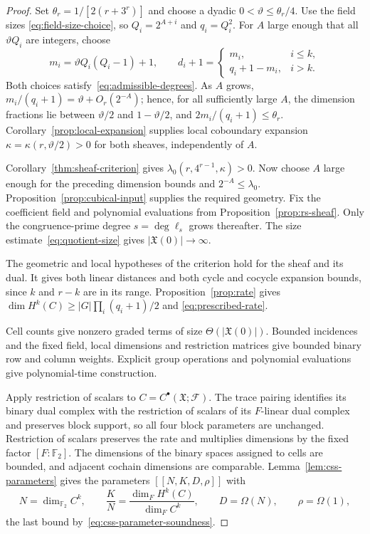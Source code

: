 \documentclass[11pt,letterpaper]{article}
\renewcommand{\le}{\leqslant}
\renewcommand{\ge}{\geqslant}
\theoremstyle{definition}
\theoremstyle{remark}
\newcommand{\F}{\mathbb F}
\newcommand{\cF}{\mathcal F}
\newcommand{\X}{\mathfrak{X}}
\begin{document}
\begin{proof}
Set $\theta_r=1/[2(r+3^r)]$ and choose a dyadic
$0<\vartheta\le\theta_r/4$. Use the field sizes
\eqref{eq:field-size-choice}, so $Q_i=2^{A+i}$ and $q_i=Q_i^2$.
For $A$ large enough that all $\vartheta Q_i$ are integers, choose
\begin{equation}
 m_i=\vartheta Q_i(Q_i-1)+1,\qquad
 d_i+1=\begin{cases}
 m_i,&i\le k,\\
 q_i+1-m_i,&i>k.
 \end{cases}
 \label{eq:local-dimensions}
\end{equation}
Both choices satisfy~\eqref{eq:admissible-degrees}. As $A$ grows,
$m_i/(q_i+1)=\vartheta+O_r(2^{-A})$; hence, for all sufficiently
large $A$, the dimension fractions lie between $\vartheta/2$
and $1-\vartheta/2$, and $2m_i/(q_i+1)\le\theta_r$.
Corollary~\ref{prop:local-expansion} supplies local coboundary
expansion $\kappa=\kappa(r,\vartheta/2)>0$ for both sheaves,
independently of $A$.

Corollary~\ref{thm:sheaf-criterion} gives
$\lambda_0(r,4^{r-1},\kappa)>0$. Now choose $A$ large enough for the
preceding dimension bounds and $2^{-A}\le\lambda_0$.
Proposition~\ref{prop:cubical-input} supplies the required geometry.
Fix the coefficient field and polynomial evaluations from
Proposition~\ref{prop:rs-sheaf}. Only the congruence-prime degree
$s=\deg\ell_s$ grows thereafter.
The size estimate~\eqref{eq:quotient-size} gives $|\X(0)|\to\infty$.

The geometric and local hypotheses of the criterion hold for
the sheaf and its dual. It gives both linear distances and
both cycle and cocycle expansion bounds, since $k$ and $r-k$ are in its
range. Proposition~\ref{prop:rate} gives
$\dim H^k(C)\ge |G|\prod_i(q_i+1)/2$ and
\eqref{eq:prescribed-rate}.

Cell counts give nonzero graded terms of size $\Theta(|\X(0)|)$.
Bounded incidences and the fixed field, local dimensions and restriction matrices
give bounded binary row and column weights. Explicit group operations
and polynomial evaluations give polynomial-time construction.

Apply restriction of scalars to $C=C^\bullet(\X;\cF)$.
The trace pairing identifies its binary dual complex with the
restriction of scalars of its $F$-linear dual complex and preserves
block support, so all four block parameters are unchanged.
Restriction of scalars preserves the rate and multiplies
dimensions by the fixed factor $[F:\F_2]$.
The dimensions of the binary spaces assigned to cells are bounded, and adjacent cochain dimensions
are comparable. Lemma~\ref{lem:css-parameters} gives the parameters
$[[N,K,D,\rho]]$ with
\[
 N=\dim_{\F_2}C^k,\qquad
 \frac KN=\frac{\dim_F H^k(C)}{\dim_F C^k},\qquad
 D=\Omega(N),\qquad \rho=\Omega(1),
\]
the last bound by~\eqref{eq:css-parameter-soundness}.
\end{proof}
\end{document}
